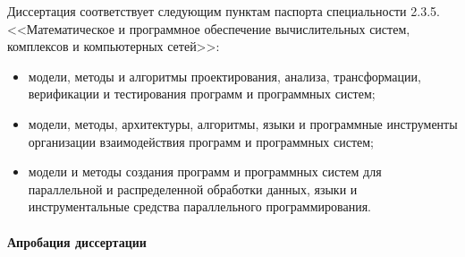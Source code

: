 \documentclass[a4paper,14pt]{extarticle}                     %
\theoremstyle{plain}                                         %
\begin{document}
Диссертация соответствует следующим пунктам паспорта специальности 2.3.5. <<Математическое и программное обеспечение вычислительных систем, комплексов и компьютерных сетей>>:
\begin{itemize}[noitemsep,topsep=0pt,parsep=0pt,partopsep=0pt]
\item модели, методы и алгоритмы проектирования, анализа, трансформации, верификации и тестирования программ и программных систем;
\item модели, методы, архитектуры, алгоритмы, языки и программные инструменты организации взаимодействия программ и программных систем;
\item модели и методы создания программ и программных систем для параллельной и распределенной обработки данных, языки и инструментальные средства параллельного программирования.
\end{itemize}

\paragraph{Апробация диссертации}

\
\end{document}
